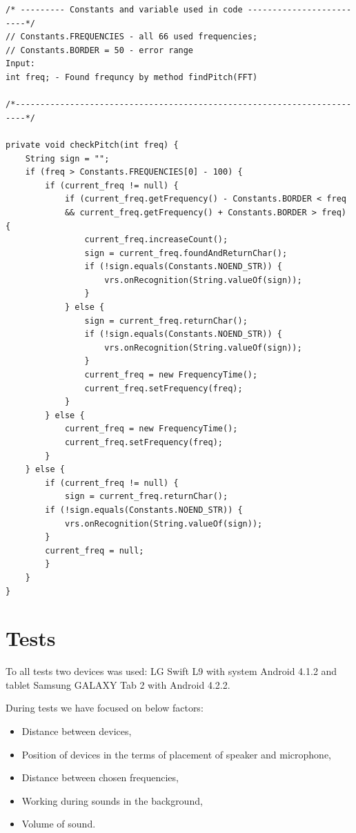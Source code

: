 \documentclass[11pt,titlepage]{article}
\theoremstyle{plain}
\begin{document}
\begin{lstlisting}
/* --------- Constants and variable used in code -------------------------*/
// Constants.FREQUENCIES - all 66 used frequencies;
// Constants.BORDER = 50 - error range
Input:
int freq; - Found frequncy by method findPitch(FFT)

/*------------------------------------------------------------------------*/

private void checkPitch(int freq) {
	String sign = "";
	if (freq > Constants.FREQUENCIES[0] - 100) {
		if (current_freq != null) {
			if (current_freq.getFrequency() - Constants.BORDER < freq
			&& current_freq.getFrequency() + Constants.BORDER > freq) {
				current_freq.increaseCount();
				sign = current_freq.foundAndReturnChar();
				if (!sign.equals(Constants.NOEND_STR)) {
					vrs.onRecognition(String.valueOf(sign));
				}
			} else {
				sign = current_freq.returnChar();
				if (!sign.equals(Constants.NOEND_STR)) {
					vrs.onRecognition(String.valueOf(sign));
				}
				current_freq = new FrequencyTime();
				current_freq.setFrequency(freq);
			}
		} else {
			current_freq = new FrequencyTime();
			current_freq.setFrequency(freq);
		}
	} else {
		if (current_freq != null) {
			sign = current_freq.returnChar();
		if (!sign.equals(Constants.NOEND_STR)) {
			vrs.onRecognition(String.valueOf(sign));
		}
		current_freq = null;
		}
	}
}
\end{lstlisting}
\section{Tests}
To all tests two devices was used: LG Swift L9 with system Android 4.1.2 and tablet Samsung GALAXY Tab 2 with Android 4.2.2. 

During tests we have focused on below factors:
\begin{itemize}
\item Distance between devices,
\item Position of devices in the terms of placement of speaker and microphone,
\item Distance between chosen frequencies,
\item Working during sounds in the background,
\item Volume of sound.
\end{itemize}
\end{document}
